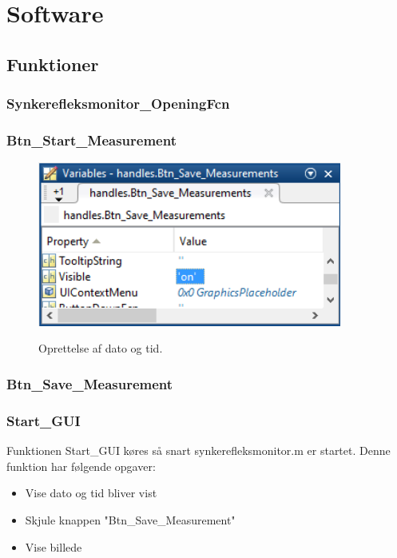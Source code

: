 \section{Software}

\subsection{Funktioner}
\subsubsection{Synkerefleksmonitor\_OpeningFcn}








\subsubsection{Btn\_Start\_Measurement}

\begin{figure}[H] 
\centering
{\includegraphics[width=10cm]
{Figure/modultestStart}}
\caption{Oprettelse af dato og tid.}
\label{fig:modultestStart}
\end{figure}


\subsubsection{Btn\_Save\_Measurement}


\subsubsection{Start\_GUI}

Funktionen Start\_GUI køres så snart synkerefleksmonitor.m er startet. Denne funktion har følgende opgaver:
\begin{itemize}
\item Vise dato og tid bliver vist
\item Skjule knappen "Btn\_Save\_Measurement"
\item Vise billede
\end{itemize}

